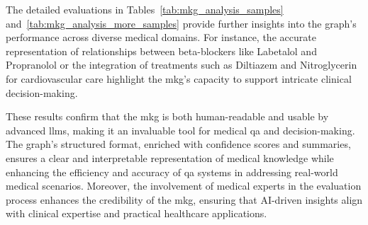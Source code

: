 The detailed evaluations in Tables~\ref{tab:mkg_analysis_samples} and~\ref{tab:mkg_analysis_more_samples} provide further insights into the graph’s performance across diverse medical domains. For instance, the accurate representation of relationships between beta-blockers like Labetalol and Propranolol or the integration of treatments such as Diltiazem and Nitroglycerin for cardiovascular care highlight the \gls{mkg}'s capacity to support intricate clinical decision-making.

These results confirm that the \gls{mkg} is both human-readable and usable by advanced \glspl{llm}, making it an invaluable tool for medical \gls{qa} and decision-making. The graph’s structured format, enriched with confidence scores and summaries, ensures a clear and interpretable representation of medical knowledge while enhancing the efficiency and accuracy of \gls{qa} systems in addressing real-world medical scenarios. Moreover, the involvement of medical experts in the evaluation process enhances the credibility of the \gls{mkg}, ensuring that AI-driven insights align with clinical expertise and practical healthcare applications.


